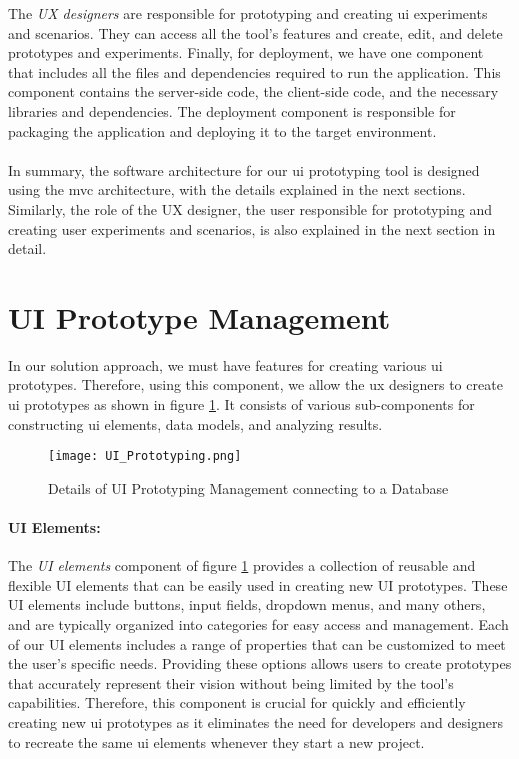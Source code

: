 The \textit{UX designers} are responsible for prototyping and creating \ac{ui} experiments and scenarios. 
They can access all the tool's features and create, edit, and delete prototypes and experiments.
Finally, for deployment, we have one component that includes all the files and dependencies required to run the application. 
This component contains the server-side code, the client-side code, and the necessary libraries and dependencies. 
The deployment component is responsible for packaging the application and deploying it to the target environment.\\\\
In summary, the software architecture for our \ac{ui} prototyping tool is designed using the \ac{mvc} architecture, with the details explained in the next sections. 
Similarly, the role of the UX designer, the user responsible for prototyping and creating user experiments and scenarios, is also explained in the next section in detail.

\clearpage
\section{UI Prototype Management}
\label{sc:section:prototyping}
In our solution approach, we must have features for creating various \ac{ui} prototypes.
Therefore, using this component, we allow the \ac{ux} designers to create \ac{ui} prototypes as shown in figure \ref{fig:sc:prototyping}.
It consists of various sub-components for constructing \ac{ui} elements, data models, and analyzing results.
\begin{figure}[htbp!]
    \centering    
    \texttt{[image: UI\_Prototyping.png]} 
    \caption[Details of UI Prototyping Management]{Details of UI Prototyping Management connecting to a Database}
    \label{fig:sc:prototyping}
\end{figure}

\paragraph{UI Elements:}
The \textit{UI elements} component of figure \ref{fig:sc:prototyping} provides a collection of reusable and flexible UI elements that can be easily used in creating new UI prototypes.
These UI elements include buttons, input fields, dropdown menus, and many others, and are typically organized into categories for easy access and management. 
Each of our UI elements includes a range of properties that can be customized to meet the user's specific needs. 
Providing these options allows users to create prototypes that accurately represent their vision without being limited by the tool's capabilities.
Therefore, this component is crucial for quickly and efficiently creating new \ac{ui} prototypes as it eliminates the need for developers and designers to recreate the same \ac{ui} elements whenever they start a new project.

